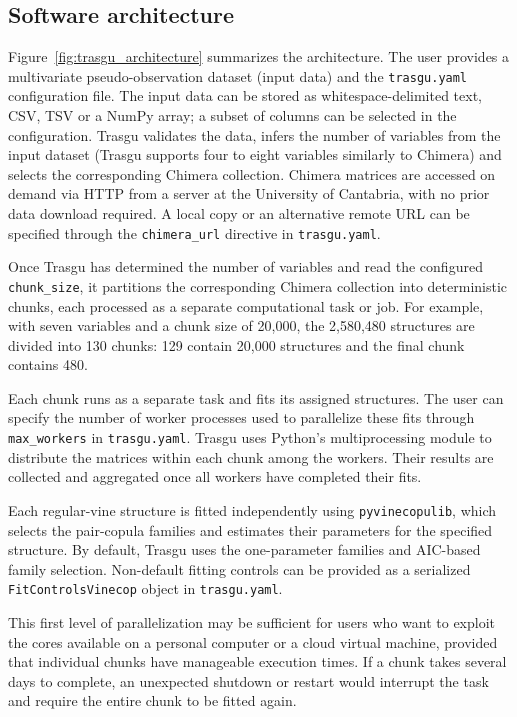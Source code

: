 \documentclass[preprint,12pt, a4paper]{elsarticle}
\begin{document}
\subsection{Software architecture}

Figure~\ref{fig:trasgu_architecture} summarizes the architecture. The user
provides a multivariate pseudo-observation dataset (input data) and the
\texttt{trasgu.yaml} configuration file. The input data can be stored as whitespace-delimited
text, CSV, TSV or a NumPy array; a subset of columns can be selected in the
configuration. 
Trasgu validates the data, infers the number of variables from the input dataset (Trasgu supports four to eight variables similarly to Chimera) and selects the corresponding Chimera collection. Chimera matrices are accessed on demand via HTTP from a server at the University of Cantabria, with no prior data download required. A local copy or an alternative remote URL can be specified through the \texttt{chimera\_url} directive in \texttt{trasgu.yaml}.  

Once Trasgu has determined the number of variables and read the configured \texttt{chunk\_size}, it partitions the corresponding Chimera collection into deterministic chunks, each processed as a separate computational task or job. For example, with seven variables and a chunk size of 20,000, the 2,580,480 structures are divided into 130 chunks: 129 contain 20,000 structures and the final chunk contains 480.

Each chunk runs as a separate task and fits its assigned structures. The user
can specify the number of worker processes used to parallelize these fits
through \texttt{max\_workers} in \texttt{trasgu.yaml}. Trasgu uses Python's
multiprocessing module to distribute the matrices within each chunk among the
workers. Their results are collected and aggregated once all workers have
completed their fits.

Each regular-vine structure is fitted independently using
\texttt{pyvinecopulib}, which selects the pair-copula families and estimates
their parameters for the specified structure. By default, Trasgu uses the
one-parameter families and AIC-based family selection. Non-default fitting controls can be provided as
a serialized \texttt{FitControlsVinecop} object in \texttt{trasgu.yaml}.

This first level of parallelization may be sufficient for users who want to exploit
the cores available on a personal computer or a cloud virtual machine, provided
that individual chunks have manageable execution times. If a chunk takes
several days to complete, an unexpected shutdown or restart would interrupt the
task and require the entire chunk to be fitted again.
\end{document}
